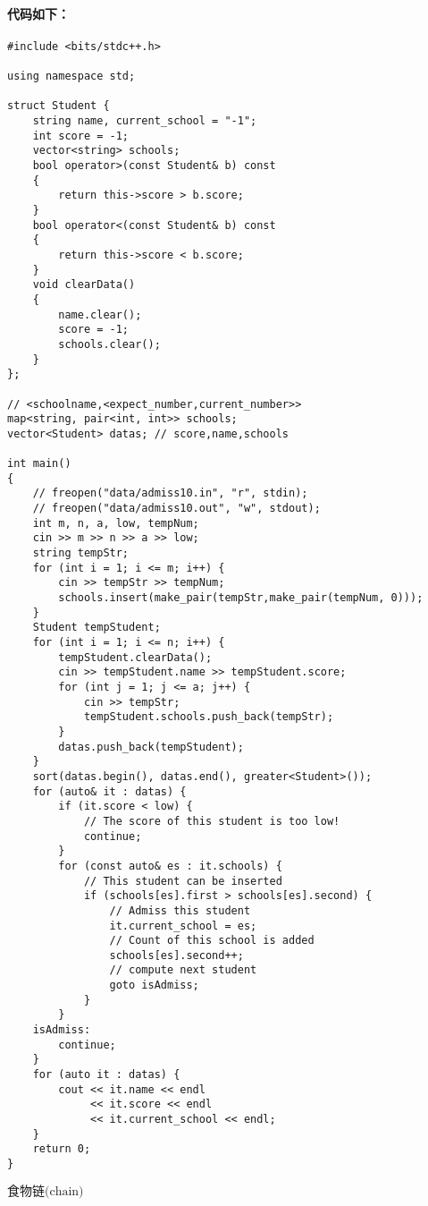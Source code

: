 \documentclass[final,11pt,oneside,UTF8]{report}
\begin{document}
\paragraph{
    代码如下：
}
{\mono
    \begin{lstlisting}
#include <bits/stdc++.h>

using namespace std;

struct Student {
    string name, current_school = "-1";
    int score = -1;
    vector<string> schools;
    bool operator>(const Student& b) const
    {
        return this->score > b.score;
    }
    bool operator<(const Student& b) const
    {
        return this->score < b.score;
    }
    void clearData()
    {
        name.clear();
        score = -1;
        schools.clear();
    }
};

// <schoolname,<expect_number,current_number>>
map<string, pair<int, int>> schools;
vector<Student> datas; // score,name,schools

int main()
{
    // freopen("data/admiss10.in", "r", stdin);
    // freopen("data/admiss10.out", "w", stdout);
    int m, n, a, low, tempNum;
    cin >> m >> n >> a >> low;
    string tempStr;
    for (int i = 1; i <= m; i++) {
        cin >> tempStr >> tempNum;
        schools.insert(make_pair(tempStr,make_pair(tempNum, 0)));
    }
    Student tempStudent;
    for (int i = 1; i <= n; i++) {
        tempStudent.clearData();
        cin >> tempStudent.name >> tempStudent.score;
        for (int j = 1; j <= a; j++) {
            cin >> tempStr;
            tempStudent.schools.push_back(tempStr);
        }
        datas.push_back(tempStudent);
    }
    sort(datas.begin(), datas.end(), greater<Student>());
    for (auto& it : datas) {
        if (it.score < low) {
            // The score of this student is too low!
            continue;
        }
        for (const auto& es : it.schools) {
            // This student can be inserted
            if (schools[es].first > schools[es].second) { 
                // Admiss this student    
                it.current_school = es;
                // Count of this school is added 
                schools[es].second++;
                // compute next student 
                goto isAdmiss; 
            }
        }
    isAdmiss:
        continue;
    }
    for (auto it : datas) {
        cout << it.name << endl
             << it.score << endl
             << it.current_school << endl;
    }
    return 0;
}
\end{lstlisting}
}
\newpage

\newpage
\centerline{\LARGE{$\textbf{食物链}\text{(chain)}$}}
\end{document}
